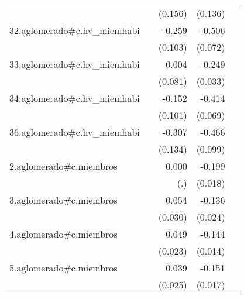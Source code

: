 {\begin{longtable}{l*{4}{D{.}{.}{-1}}}
            &                     &     (0.156)         &     (0.136)         &                     \\
\addlinespace
32.aglomerado#c.hv\_miemhabi&                     &      -0.259\sym{*}  &      -0.506\sym{***}&                     \\
            &                     &     (0.103)         &     (0.072)         &                     \\
\addlinespace
33.aglomerado#c.hv\_miemhabi&                     &       0.004         &      -0.249\sym{***}&                     \\
            &                     &     (0.081)         &     (0.033)         &                     \\
\addlinespace
34.aglomerado#c.hv\_miemhabi&                     &      -0.152         &      -0.414\sym{***}&                     \\
            &                     &     (0.101)         &     (0.069)         &                     \\
\addlinespace
36.aglomerado#c.hv\_miemhabi&                     &      -0.307\sym{*}  &      -0.466\sym{***}&                     \\
            &                     &     (0.134)         &     (0.099)         &                     \\
\addlinespace
2.aglomerado#c.miembros&                     &       0.000         &      -0.199\sym{***}&                     \\
            &                     &         (.)         &     (0.018)         &                     \\
\addlinespace
3.aglomerado#c.miembros&                     &       0.054         &      -0.136\sym{***}&                     \\
            &                     &     (0.030)         &     (0.024)         &                     \\
\addlinespace
4.aglomerado#c.miembros&                     &       0.049\sym{*}  &      -0.144\sym{***}&                     \\
            &                     &     (0.023)         &     (0.014)         &                     \\
\addlinespace
5.aglomerado#c.miembros&                     &       0.039         &      -0.151\sym{***}&                     \\
            &                     &     (0.025)         &     (0.017)         &                     \\

\end{longtable}}
